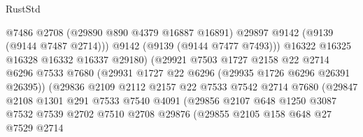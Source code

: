 \begin{lexlean}{RustStd}
\begin{coremodule}
                                      @7486
                                      @2708
                                      (@29890 @890 @4379 @16887 @16891)
                                      @29897
                                      @9142
                                      (@9139 (@9144 @7487 @2714)))
                                    @9142
                                    (@9139 (@9144 @7477 @7493)))
                                  @16322
                                  @16325
                                  @16328
                                  @16332
                                  @16337
                                  @29180)
                                (@29921
                                  @7503
                                  @1727
                                  @2158
                                  @22
                                  @2714
                                  @6296
                                  @7533
                                  @7680
                                  (@29931 @1727 @22 @6296 (@29935 @1726 @6296 @26391 @26395))
                                  (@29836
                                    @2109
                                    @2112
                                    @2157
                                    @22
                                    @7533
                                    @7542
                                    @2714
                                    @7680
                                    (@29847
                                      @2108
                                      @1301
                                      @291
                                      @7533
                                      @7540
                                      @4091
                                      (@29856
                                        @2107
                                        @648
                                        @1250
                                        @3087
                                        @7532
                                        @7539
                                        @2702
                                        @7510
                                        @2708
                                        @29876
                                        (@29855
                                          @2105
                                          @158
                                          @648
                                          @27
                                          @7529
                                          @2714

\end{coremodule}
\end{lexlean}
